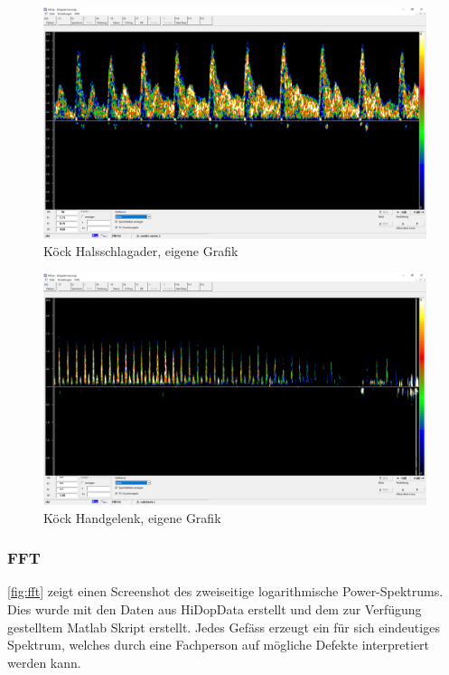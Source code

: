 \documentclass[11pt]{scrartcl}
\begin{document}
    \begin{figure}[H]
        \includegraphics[width=15cm]{images/Leona_Hals.png}
        \caption{Köck Halsschlagader, eigene Grafik}
    \end{figure}
    \begin{figure}[H]
        \includegraphics[width=15cm]{images/Leona_Handgelenk.png}
        \caption{Köck Handgelenk, eigene Grafik}
    \end{figure}

    \pagebreak

    \subsubsection{FFT}

    \autoref{fig:fft} zeigt einen Screenshot des zweiseitige logarithmische Power-Spektrums.
    Dies wurde mit den Daten aus HiDopData erstellt und dem zur Verfügung gestelltem Matlab Skript erstellt.
    Jedes Gefäss erzeugt ein für sich eindeutiges Spektrum, welches durch eine Fachperson auf mögliche Defekte interpretiert werden kann.
\end{document}
